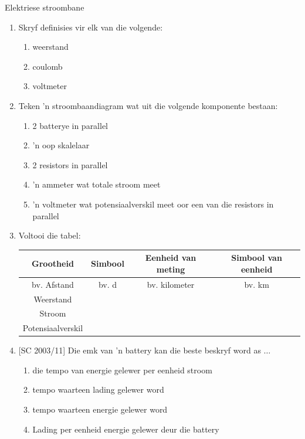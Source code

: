 \begin{eocexercises}{Elektriese stroombane}

\begin{enumerate}[noitemsep, label=\textbf{\arabic*}. ] 
\item{ Skryf definisies vir elk van die volgende:
  \begin{enumerate}[noitemsep, label=\textbf{\alph*}. ] 
  \item weerstand
  \item coulomb
  \item voltmeter
  \end{enumerate}}

\item{ Teken 'n stroombaandiagram wat uit die volgende komponente bestaan:
  \begin{enumerate}[noitemsep, label=\textbf{\alph*}. ] 
  \item 2 batterye in parallel
  \item 'n oop skalelaar
  \item 2 resistors in parallel
  \item 'n ammeter wat totale stroom meet
  \item 'n voltmeter wat potensiaalverskil meet oor een van die
resistors in parallel
  \end{enumerate}}

\item{ Voltooi die tabel: \\

\begin{tabular}{ | c | c | c | c| } \hline 
\textbf{Grootheid} & \textbf{Simbool} & \textbf{Eenheid van meting} &
\textbf{Simbool van eenheid} \\ \hline \hline 
bv. Afstand & bv. d & bv. kilometer & bv. km \\ \hline 
Weerstand &   &   &  \\ \hline
Stroom  &   &   &  \\ \hline
Potensiaalverskil  &   &   &  \\ \hline
\hline
\end{tabular}
}

\item{[SC 2003/11] Die emk van 'n battery kan die beste beskryf word as $\dots$
\begin{enumerate}[noitemsep, label=\textbf{\alph*}. ] 
\item{die tempo van energie gelewer per eenheid stroom}
\item{tempo waarteen lading gelewer word}
\item{tempo waarteen energie gelewer word}
\item{Lading per eenheid energie gelewer deur die battery}
\end{enumerate}}


\end{enumerate}
\end{eocexercises}
